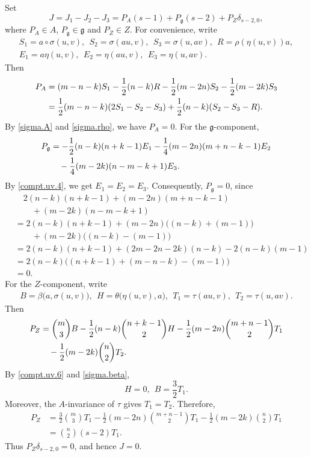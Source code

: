 \documentclass[12pt]{article}
\numberwithin{equation}{section}
\theoremstyle{definition}
\theoremstyle{plain}
\newcommand{\fg}{\mathfrak{g}}
\begin{document}
Set
\begin{equation*}
    J=J_1-J_2-J_3=P_A(s-1)+P_\fg(s-2)+P_Z\delta_{s-2,0},
\end{equation*}
where $P_A\in A$, $P_\fg\in\fg$ and $P_Z\in Z$. For convenience, write
\begin{gather*}
    S_1=a\circ\sigma(u,v),\ \ S_2=\sigma(au,v),\ \ S_3=\sigma(u,av),\ \ R=\rho(\eta(u,v))a,\\
    E_1=a\eta(u,v),\ \ E_2=\eta(au,v),\ \ E_3=\eta(u,av).
\end{gather*}
Then
\begin{align}
    P_A&=(m-n-k)S_1-\frac12(n-k)R-\frac12(m-2n)S_2-\frac12(m-2k)S_3\notag\\
    &=\frac12(m-n-k)(2S_1-S_2-S_3)+\frac12(n-k)(S_2-S_3-R).\label{J.auu.A}
\end{align}
By \eqref{sigma.A} and \eqref{sigma.rho}, we have $P_A=0$. For the $\fg$-component,
\begin{align}
    P_\fg&=-\frac12(n-k)(n+k-1)E_1-\frac14(m-2n)(m+n-k-1)E_2\notag\\
    &\quad-\frac14(m-2k)(n-m-k+1)E_3.\label{J.auu.g}
\end{align}
By \eqref{compt.uv.4}, we get $E_1=E_2=E_3$. Consequently, $P_\fg=0$, since
\begin{align*}
    &\quad2(n-k)(n+k-1)+(m-2n)(m+n-k-1)\\
    &\qquad+(m-2k)(n-m-k+1)\\
    &=2(n-k)(n+k-1)+(m-2n)\big((n-k)+(m-1)\big)\\
    &\qquad+(m-2k)\big((n-k)-(m-1)\big)\\
    &=2(n-k)(n+k-1)+(2m-2n-2k)(n-k)-2(n-k)(m-1)\\
    &=2(n-k)\big((n+k-1)+(m-n-k)-(m-1)\big)\\
    &=0.
\end{align*}
For the $Z$-component, write
\begin{gather*}
    B=\beta\big(a,\sigma(u,v)\big),\ \ H=\theta\big(\eta(u,v),a\big),\ \ T_1=\tau(au,v),\ \ T_2=\tau(u,av).
\end{gather*}
Then
\begin{align}
    P_Z&=\binom m3 B-\frac12(n-k)\binom{n+k-1}{2}H-\frac12(m-2n)\binom{m+n-1}{2}T_1
      \notag\\
      &\quad-\frac12(m-2k)\binom n2 T_2.\label{J.auu.C}
\end{align}
By \eqref{compt.uv.6} and \eqref{sigma.beta},
\begin{equation*}
    H=0,\ \ B=\frac32T_1.
\end{equation*}
Moreover, the $A$-invariance of $\tau$ gives $T_1=T_2$. Therefore,
\begin{align*}
    P_Z&=\frac32\binom m3 T_1-\frac12(m-2n)\binom{m+n-1}{2}T_1-\frac12(m-2k)\binom n2
      T_1\\
    &=\binom n2(s-2)T_1.
\end{align*}
Thus $P_Z\delta_{s-2,0}=0$, and hence $J=0$.
\end{document}
